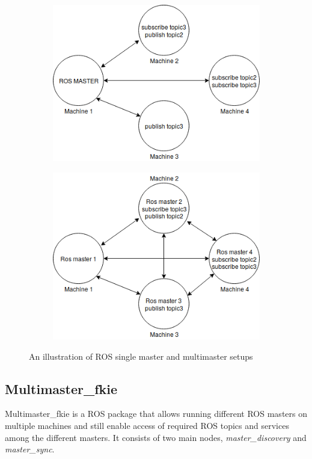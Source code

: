 \begin{figure}[h]
	\centering
	\begin{subfigure}{0.5\textwidth}
		\centering
		\includegraphics[scale=0.5]{Pictures/singleMaster.png}
	\end{subfigure}%
	\begin{subfigure}{0.5\textwidth}
		\centering
		\includegraphics[scale=0.5]{Pictures/multimaster.png}
	\end{subfigure}
	\caption{An illustration of ROS single master and multimaster setups}
	\label{fig: mastercomp}
\end{figure}

\subsection{Multimaster\_fkie}
Multimaster\_fkie \cite{fkie1, fkie2} is a ROS package that allows running  different ROS masters on multiple machines and still enable access of required ROS topics and services among the different masters. It consists of two main nodes, \textit{master\_discovery} and \textit{master\_sync}. 

